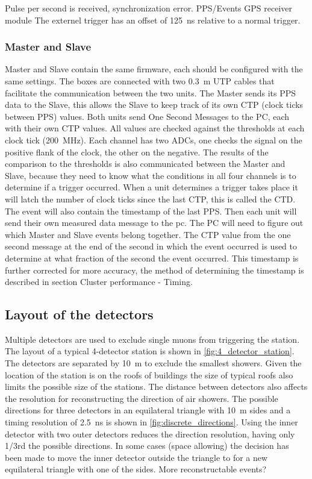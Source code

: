 Pulse per second is received, synchronization error.
PPS/Events
GPS receiver module \cite{trimble}
The externel trigger has an offset of \SI{125}{\ns} relative to a normal trigger.


\subsubsection{Master and Slave}
\label{sub:masterslave}

Master and Slave contain the same firmware, each should be configured with the same settings. The boxes are connected with two \SI{0.3}{\meter} UTP cables that facilitate the communication between the two units. The Master sends its PPS data to the Slave, this allows the Slave to keep track of its own CTP (clock ticks between PPS) values. Both units send One Second Messages to the PC, each with their own CTP values. All \adc values are checked against the thresholds at each clock tick (\SI{200}{\mega\hertz}). Each channel has two ADCs, one checks the signal on the positive flank of the clock, the other on the negative. The results of the comparison to the thresholds is also communicated between the Master and Slave, because they need to know what the conditions in all four channels is to determine if a trigger occurred. When a unit determines a trigger takes place it will latch the number of clock ticks since the last CTP, this is called the CTD. The event will also contain the timestamp of the last PPS. Then each unit will send their own measured data message to the pc. The PC will need to figure out which Master and Slave events belong together. The CTP value from the one second message at the end of the second in which the event occurred is used to determine at what fraction of the second the event occurred. This timestamp is further corrected for more accuracy, the method of determining the \gps timestamp is described in section Cluster performance - Timing.


\subsection{Layout of the detectors}

Multiple detectors are used to exclude single muons from triggering the station. The layout of a  typical 4-detector station is shown in \cref{fig:4_detector_station}. The detectors are separated by \SI{10}{\meter} to exclude the smallest showers. Given the location of the station is on the roofs of buildings the size of typical roofs also limits the possible size of the stations. The distance between detectors also affects the resolution for reconstructing the direction of air showers. The possible directions for three detectors in an equilateral triangle with \SI{10}{\meter} sides and a timing resolution of \SI{2.5}{\ns} is shown in \cref{fig:discrete_directions}. Using the inner detector with two outer detectors reduces the direction resolution, having only 1/3rd the possible directions. In some cases (space allowing) the decision has been made to move the inner detector outside the triangle to for a new equilateral triangle with one of the sides. More reconstructable events?

